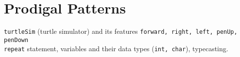 \clearpage
\section{Prodigal Patterns}{\label{sec:prodigalpatterns}}
\begin{topics}
\verb!turtleSim! (turtle simulator) and its features \verb!forward, right, left, penUp, penDown!\\
\verb!repeat! statement, variables and their data types (\verb!int, char!), typecasting.
\end{topics}





